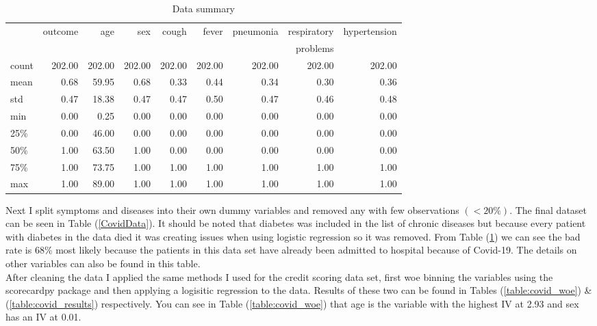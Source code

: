 \begin{table}[H]
	\begin{tabular}{lrrrrrrrr}
	\toprule
	{} &  outcome &     age &     sex &   cough &   fever &  pneumonia &  respiratory &  hypertension \\
	{} & {} & {} & {} & {} & {} & {} & problems & {} \\
	\midrule
	count &   202.00 &  202.00 &  202.00 &  202.00 &  202.00 &     202.00 &                202.00 &        202.00 \\
	mean  &     0.68 &   59.95 &    0.68 &    0.33 &    0.44 &       0.34 &                  0.30 &          0.36 \\
	std   &     0.47 &   18.38 &    0.47 &    0.47 &    0.50 &       0.47 &                  0.46 &          0.48 \\
	min   &     0.00 &    0.25 &    0.00 &    0.00 &    0.00 &       0.00 &                  0.00 &          0.00 \\
	25\%   &     0.00 &   46.00 &    0.00 &    0.00 &    0.00 &       0.00 &                  0.00 &          0.00 \\
	50\%   &     1.00 &   63.50 &    1.00 &    0.00 &    0.00 &       0.00 &                  0.00 &          0.00 \\
	75\%   &     1.00 &   73.75 &    1.00 &    1.00 &    1.00 &       1.00 &                  1.00 &          1.00 \\
	max   &     1.00 &   89.00 &    1.00 &    1.00 &    1.00 &       1.00 &                  1.00 &          1.00 \\
	\bottomrule
	\end{tabular}
	\caption{Data summary \label{table:covid_data_sum}}
\end{table}

Next I split symptoms and diseases into their own dummy variables and removed any with few observations $( < 20\% )$. The final dataset can be seen in Table (\ref{CovidData}). It should be noted that diabetes was included in the list of chronic diseases but because every patient with diabetes in the data died it was creating issues when using logistic regression so it was removed. From Table (\ref{table:covid_data_sum}) we can see the bad rate is 68\% most likely because the patients in this data set have already been admitted to hospital because of Covid-19. The details on other variables can also be found in this table.\\

After cleaning the data I applied the same methods I used for the credit scoring data set, first woe binning the variables using the scorecardpy package and then applying a logisitic regression to the data. Results of these two can be found in Tables (\ref{table:covid_woe}) \& (\ref{table:covid_results}) respectively. You can see in Table (\ref{table:covid_woe}) that age is the variable with the highest IV at 2.93 and sex has an IV at 0.01. \\

